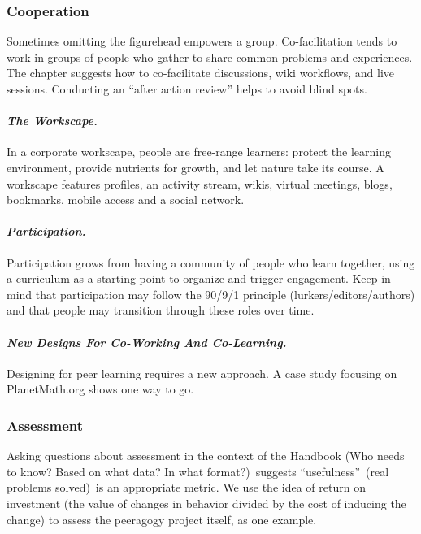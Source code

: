 \subsubsection{Cooperation}

\noindent Sometimes omitting the figurehead empowers a
group. Co-facilitation tends to work in groups of people who gather to
share common problems and experiences. The chapter suggests how to
co-facilitate discussions, wiki workflows, and live
sessions. Conducting an ``after action review'' helps to avoid blind
spots.

\paragraph{\emph{The Workscape.}} In a corporate workscape, people are free-range
learners: protect the learning environment, provide nutrients for
growth, and let nature take its course. A workscape features profiles,
an activity stream, wikis, virtual meetings, blogs, bookmarks, mobile
access and a social network.

\paragraph{\emph{Participation.}} Participation grows from having a
community of people who learn together, using a curriculum as a starting
point to organize and trigger engagement. Keep in mind that
participation may follow the 90/9/1 principle (lurkers/editors/authors)
and that people may transition through these roles over time.

\paragraph{\emph{New Designs For Co-Working And Co-Learning.}} Designing for
peer learning requires a new approach.  A case study focusing on
PlanetMath.org shows one way to go.

\subsubsection{Assessment}

\noindent Asking questions about assessment in the context of the
Handbook (Who needs to know? Based on what data? In what format?)~suggests ``usefulness''~(real problems solved)~is an appropriate
metric. We use the idea of return on investment (the value of changes
in behavior divided by the cost of inducing the change) to assess the
peeragogy project itself, as one example.

